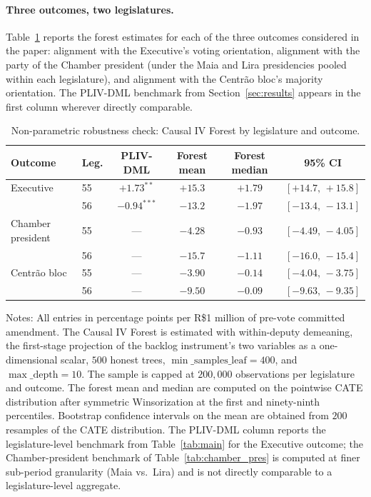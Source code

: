 \documentclass[pdflatex,sn-basic]{sn-jnl}
\begin{document}
\paragraph{Three outcomes, two legislatures.} Table~\ref{tab:cforest} reports the forest estimates for each of the three outcomes considered in the paper: alignment with the Executive's voting orientation, alignment with the party of the Chamber president (under the Maia and Lira presidencies pooled within each legislature), and alignment with the Centr\~ao bloc's majority orientation. The PLIV-DML benchmark from Section~\ref{sec:results} appears in the first column wherever directly comparable.

\begin{table}[htbp]
\centering
\caption{Non-parametric robustness check: Causal IV Forest by legislature and outcome.}
\label{tab:cforest}
\footnotesize
\setlength{\tabcolsep}{4pt}
\begin{tabular}{llcccc}
\toprule
Outcome & Leg. & PLIV-DML & Forest mean & Forest median & 95\% CI \\
\midrule
Executive         & 55 & $+1.73^{**}$  & $+15.3$ & $+1.79$ & $[+14.7,\,+15.8]$ \\
                   & 56 & $-0.94^{***}$ & $-13.2$ & $-1.97$ & $[-13.4,\,-13.1]$ \\
\addlinespace
Chamber president & 55 & ---           & $-4.28$ & $-0.93$ & $[-4.49,\,-4.05]$ \\
                   & 56 & ---           & $-15.7$ & $-1.11$ & $[-16.0,\,-15.4]$ \\
\addlinespace
Centr\~ao bloc     & 55 & ---           & $-3.90$ & $-0.14$ & $[-4.04,\,-3.75]$ \\
                   & 56 & ---           & $-9.50$ & $-0.09$ & $[-9.63,\,-9.35]$ \\
\bottomrule
\end{tabular}
\begin{tablenotes}
\small
\item Notes: All entries in percentage points per R\$1 million of pre-vote committed amendment. The Causal IV Forest is estimated with within-deputy demeaning, the first-stage projection of the backlog instrument's two variables as a one-dimensional scalar, $500$ honest trees, $\min\_\mathrm{samples\_leaf} = 400$, and $\max\_\mathrm{depth} = 10$. The sample is capped at $200{,}000$ observations per legislature and outcome. The forest mean and median are computed on the pointwise CATE distribution after symmetric Winsorization at the first and ninety-ninth percentiles. Bootstrap confidence intervals on the mean are obtained from $200$ resamples of the CATE distribution. The PLIV-DML column reports the legislature-level benchmark from Table~\ref{tab:main} for the Executive outcome; the Chamber-president benchmark of Table~\ref{tab:chamber_pres} is computed at finer sub-period granularity (Maia vs.\ Lira) and is not directly comparable to a legislature-level aggregate.
\end{tablenotes}
\end{table}
\end{document}
